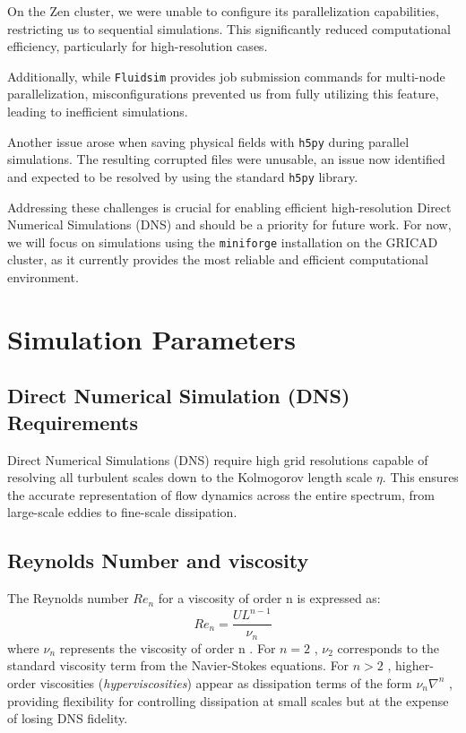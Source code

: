 \documentclass[final,5p,times,twocolumn,authoryear]{elsarticle}
\begin{document}
On the Zen cluster, we were unable to configure its parallelization capabilities, restricting us to sequential simulations. This significantly reduced computational efficiency, particularly for high-resolution cases.

Additionally, while \texttt{Fluidsim} provides job submission commands for multi-node parallelization, misconfigurations prevented us from fully utilizing this feature, leading to inefficient simulations.

Another issue arose when saving physical fields with \texttt{h5py} during parallel simulations. The resulting corrupted files were unusable, an issue now identified and expected to be resolved by using the standard \texttt{h5py} library.

Addressing these challenges is crucial for enabling efficient high-resolution Direct Numerical Simulations (DNS) and should be a priority for future work. For now, we will focus on simulations using the \texttt{miniforge} installation on the GRICAD cluster, as it currently provides the most reliable and efficient computational environment.

\section{Simulation Parameters}

\subsection{Direct Numerical Simulation (DNS) Requirements}

Direct Numerical Simulations (DNS) require high grid resolutions capable of resolving all turbulent scales down to the Kolmogorov length scale $\eta$. This ensures the accurate representation of flow dynamics across the entire spectrum, from large-scale eddies to fine-scale dissipation. 


\subsection{Reynolds Number and viscosity}

The Reynolds number  $Re_n$  for a viscosity of order n is expressed as:
\begin{equation*}
Re_n = \frac{U L^{n-1}}{\nu_n}
\end{equation*}
where  $\nu_n$ represents the viscosity of order  n . For  $n = 2$ ,  $\nu_2$  corresponds to the standard viscosity term from the Navier-Stokes equations. For  $n > 2$ , higher-order viscosities (\textit{hyperviscosities}) appear as dissipation terms of the form  $\nu_n \nabla^n$ , providing flexibility for controlling dissipation at small scales but at the expense of losing DNS fidelity.
\end{document}
